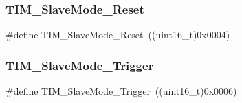 \subsubsection{\texorpdfstring{TIM\_SlaveMode\_Reset}{TIM\_SlaveMode\_Reset}}
{\footnotesize\ttfamily \#define T\+I\+M\+\_\+\+Slave\+Mode\+\_\+\+Reset~((uint16\+\_\+t)0x0004)}

\mbox{\label{group___t_i_m___slave___mode_ga9e7726c04ee1bafec97226f08adf5677}} 
\subsubsection{\texorpdfstring{TIM\_SlaveMode\_Trigger}{TIM\_SlaveMode\_Trigger}}
{\footnotesize\ttfamily \#define T\+I\+M\+\_\+\+Slave\+Mode\+\_\+\+Trigger~((uint16\+\_\+t)0x0006)}

